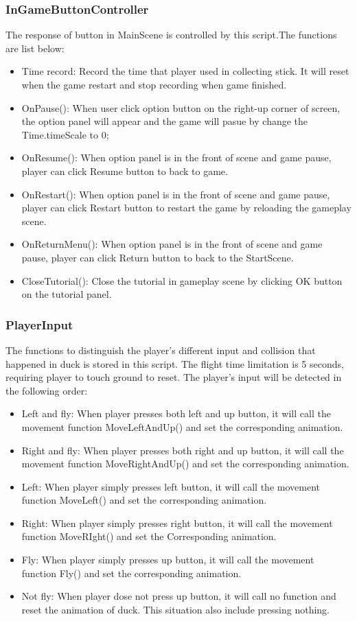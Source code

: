 \documentclass[12pt]{article}
\begin{document}
\subsubsection{InGameButtonController}
The response of button in MainScene is controlled by this script.The functions are list below:
\begin{itemize}
\item Time record: Record the time that player used in collecting stick. It will reset when the game restart and stop recording when game finished.
\item OnPause(): When user click option button on the right-up corner of screen, the option panel will appear and the game will pasue by change the Time.timeScale to 0;
\item OnResume(): When option panel is in the front of scene and game pause, player can click Resume button to back to game.
\item OnRestart(): When option panel is in the front of scene and game pause, player can click Restart button to restart the game by reloading the gameplay scene.
\item OnReturnMenu(): When option panel is in the front of scene and game pause, player can click Return button to back to the StartScene.
\item CloseTutorial(): Close the tutorial in gameplay scene by clicking OK button on the tutorial panel.
\end{itemize}

\subsubsection{PlayerInput}
The functions to distinguish the player's different input and collision that happened in duck is stored in this script. The flight time limitation is 5 seconds, requiring player to touch ground to reset. The player's input will be detected in the following order:
\begin{itemize}
\item Left and fly: When player presses both left and up button, it will call the movement function MoveLeftAndUp() and set the corresponding animation.
\item Right and fly: When player presses both right and up button, it will call the movement function MoveRightAndUp() and set the corresponding animation.
\item Left: When player simply presses left button, it will call the movement function MoveLeft() and set the corresponding animation.
\item Right: When player simply presses right button, it will call the movement function MoveRIght() and set the Corresponding animation.
\item Fly: When player simply presses up button, it will call the movement function Fly() and set the corresponding animation.
\item Not fly: When player dose not press up button, it will call no function and reset the animation of duck. This situation also include pressing nothing.
\end{itemize}
\end{document}

